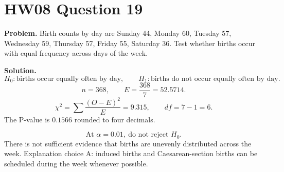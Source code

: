 \documentclass[11pt]{article}
\begin{document}
\section*{HW08 Question 19}

\textbf{Problem.} Birth counts by day are Sunday 44, Monday 60, Tuesday 57, Wednesday 59, Thursday 57, Friday 55, Saturday 36. Test whether births occur with equal frequency across days of the week.

\textbf{Solution.}
\[
H_0:\text{births occur equally often by day},\qquad
H_1:\text{births do not occur equally often by day}.
\]
\[
n=368,\qquad E=\frac{368}{7}=52.5714.
\]
\[
\chi^2=\sum\frac{(O-E)^2}{E}=9.315,\qquad df=7-1=6.
\]
The P-value is \(0.1566\) rounded to four decimals.

\[
\boxed{\text{At }\alpha=0.01,\ \text{do not reject }H_0.}
\]
There is not sufficient evidence that births are unevenly distributed across the week. Explanation choice A: induced births and Caesarean-section births can be scheduled during the week whenever possible.
\end{document}
